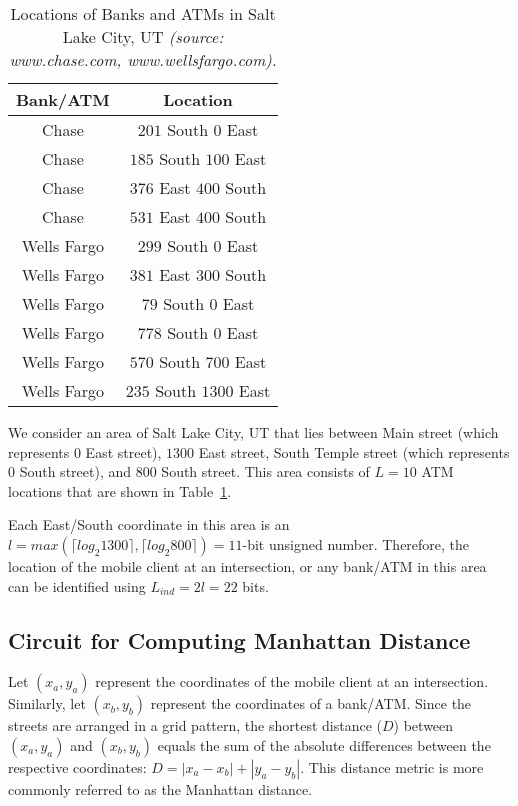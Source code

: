 \documentclass[10pt,journal,cspaper,compsoc]{IEEEtran}
\begin{document}
\begin{table}[!t]
\renewcommand{\arraystretch}{1.3}
\caption{Locations of Banks and ATMs in Salt Lake City, UT {\em (source: www.chase.com, www.wellsfargo.com).}}
\label{table_atm_locations}
\centering
\begin{tabular}{||c||c||}
\hline
\bfseries Bank/ATM & \bfseries Location\\
\hline
Chase & $201$ South $0$ East\\
\hline
Chase & $185$ South $100$ East\\
\hline
Chase & $376$ East $400$ South\\
\hline
Chase & $531$ East $400$ South\\
\hline
Wells Fargo & $299$ South $0$ East\\
\hline
Wells Fargo & $381$ East $300$ South\\
\hline
Wells Fargo & $79$ South $0$ East\\
\hline
Wells Fargo & $778$ South $0$ East\\
\hline
Wells Fargo & $570$ South $700$ East\\
\hline
Wells Fargo & $235$ South $1300$ East\\
\hline
\end{tabular}
\end{table}


We consider an area of Salt Lake City, UT that lies between Main street (which represents $0$ East street), $1300$ East street, South Temple street (which represents $0$ South street), and $800$ South street. This area consists of $L=10$ ATM locations that are shown in Table~\ref{table_atm_locations}.


Each East/South coordinate in this area is an $l=max(\lceil log_2 1300\rceil, \lceil log_2 800\rceil) = 11$-bit unsigned number. Therefore, the location of the mobile client at an intersection, or any bank/ATM in this area can be identified using $L_{ind}=2l=22$ bits.


\subsection{Circuit for Computing Manhattan Distance}

Let $(x_a, y_a)$ represent the coordinates of the mobile client at an intersection. Similarly, let $(x_b, y_b)$ represent the coordinates of a bank/ATM. Since the streets are arranged in a grid pattern, the shortest distance ($D$) between $(x_a, y_a)$ and $(x_b, y_b)$ equals the sum of the absolute differences between the respective coordinates: $D=|x_a - x_b|+|y_a - y_b|$. This distance metric is more commonly referred to as the Manhattan distance.
\end{document}

